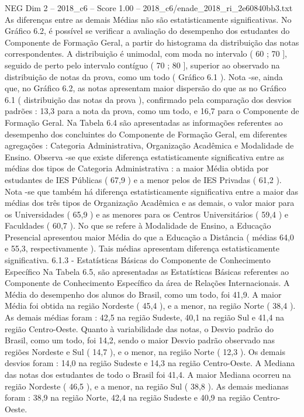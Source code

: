 \begin{textsample}{NEG Dim 2 – 2018\_c6 – Score 1.00 – 2018\_c6/enade\_2018\_ri\_2e60840bb3.txt}
As diferenças entre as demais Médias não são estatisticamente significativas.
No Gráfico 6.2, é possível se verificar a avaliação do desempenho dos estudantes do Componente de Formação Geral, a partir do histograma da distribuição das notas correspondentes.
A distribuição é unimodal, com moda no intervalo ( 60 ; 70 ], seguido de perto pelo intervalo contíguo ( 70 ; 80 ], superior ao observado na distribuição de notas da prova, como um todo ( Gráfico 6.1 ).
Nota -se, ainda que, no Gráfico 6.2, as notas apresentam maior dispersão do que as no Gráfico 6.1 ( distribuição das notas da prova ), confirmado pela comparação dos desvios padrões : 13,3 para a nota da prova, como um todo, e 16,7 para o Componente de Formação Geral.
Na Tabela 6.4 são apresentadas as informações referentes ao desempenho dos concluintes do Componente de Formação Geral, em diferentes agregações : Categoria Administrativa, Organização Acadêmica e Modalidade de Ensino.
Observa -se que existe diferença estatisticamente significativa entre as médias dos tipos de Categoria Administrativa : a maior Média obtida por estudantes de IES Públicas ( 67,9 ) e a menor pelos de IES Privadas ( 61,2 ).
Nota -se que também há diferença estatisticamente significativa entre a maior das médias dos três tipos de Organização Acadêmica e as demais, o valor maior para os Universidades ( 65,9 ) e as menores para os Centros Universitários ( 59,4 ) e Faculdades ( 60,7 ).
No que se refere à Modalidade de Ensino, a Educação Presencial apresentou maior Média do que a Educação a Distância ( médias 64,0 e 55,3, respectivamente ).
Tais médias apresentam diferença estatisticamente significativa. 6.1.3 - Estatísticas Básicas do Componente de Conhecimento Específico Na Tabela 6.5, são apresentadas as Estatísticas Básicas referentes ao Componente de Conhecimento Específico da área de Relações Internacionais.
A Média do desempenho dos alunos do Brasil, como um todo, foi 41,9.
A maior Média foi obtida na região Nordeste ( 45,4 ), e a menor, na região Norte ( 38,4 ).
As demais médias foram : 42,5 na região Sudeste, 40,1 na região Sul e 41,4 na região Centro-Oeste.
Quanto à variabilidade das notas, o Desvio padrão do Brasil, como um todo, foi 14,2, sendo o maior Desvio padrão observado nas regiões Nordeste e Sul ( 14,7 ), e o menor, na região Norte ( 12,3 ).
Os demais desvios foram : 14,0 na região Sudeste e 14,3 na região Centro-Oeste.
A Mediana das notas dos estudantes de todo o Brasil foi 41,4.
A maior Mediana ocorreu na região Nordeste ( 46,5 ), e a menor, na região Sul ( 38,8 ).
As demais medianas foram : 38,9 na região Norte, 42,4 na região Sudeste e 40,9 na região Centro-Oeste.

\end{textsample}

